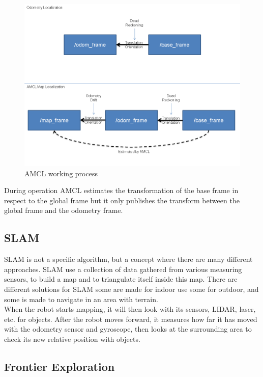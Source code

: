 \begin{figure}[h]
    \centering
    \includegraphics[width=.7\textwidth]{figures/AMCL.png}
    \caption{AMCL working process\cite{AMCL}} 
    \label{fig:amcl} 
\end{figure}

 During operation AMCL estimates the transformation of the base frame in respect to the global frame but it only publishes the transform between the global frame and the odometry frame\cite{AMCL}.

\subsection{SLAM}
SLAM is not a specific algorithm, but a concept where there are many different approaches. SLAM use a collection of data gathered from various measuring sensors, to build a map and to triangulate itself inside this map.
There are different solutions for SLAM some are made for indoor use some for outdoor, and some is made to navigate in an area with terrain.\\
When the robot starts mapping, it will then look with its sensors, LIDAR, laser, etc. for objects. After the robot moves forward, it measures how far it has moved with the odometry sensor and gyroscope, then looks at the surrounding area to check its new relative position with objects\cite{SLAMdummies}\cite{DifferentSLAM}\cite{GyrosOdometry}.\\

\subsection{Frontier Exploration}


